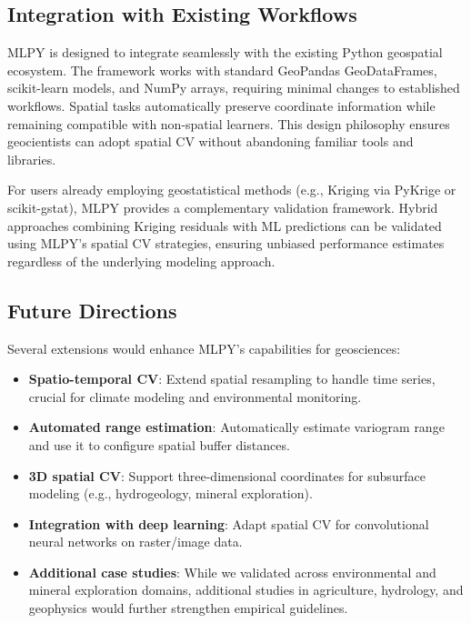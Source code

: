 \documentclass[a4paper,fleqn]{cas-sc}
\begin{document}
\subsection{Integration with Existing Workflows}

MLPY is designed to integrate seamlessly with the existing Python geospatial ecosystem. The framework works with standard GeoPandas GeoDataFrames, scikit-learn models, and NumPy arrays, requiring minimal changes to established workflows. Spatial tasks automatically preserve coordinate information while remaining compatible with non-spatial learners. This design philosophy ensures geocientists can adopt spatial CV without abandoning familiar tools and libraries.

For users already employing geostatistical methods (e.g., Kriging via PyKrige or scikit-gstat), MLPY provides a complementary validation framework. Hybrid approaches combining Kriging residuals with ML predictions can be validated using MLPY's spatial CV strategies, ensuring unbiased performance estimates regardless of the underlying modeling approach.

\subsection{Future Directions}

Several extensions would enhance MLPY's capabilities for geosciences:

\begin{itemize}
\item \textbf{Spatio-temporal CV}: Extend spatial resampling to handle time series, crucial for climate modeling and environmental monitoring.
\item \textbf{Automated range estimation}: Automatically estimate variogram range and use it to configure spatial buffer distances.
\item \textbf{3D spatial CV}: Support three-dimensional coordinates for subsurface modeling (e.g., hydrogeology, mineral exploration).
\item \textbf{Integration with deep learning}: Adapt spatial CV for convolutional neural networks on raster/image data.
\item \textbf{Additional case studies}: While we validated across environmental and mineral exploration domains, additional studies in agriculture, hydrology, and geophysics would further strengthen empirical guidelines.
\end{itemize}

\end{document}
